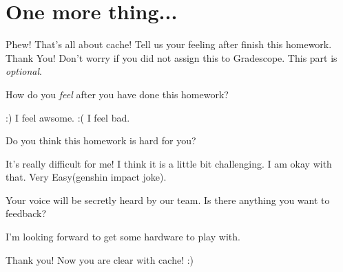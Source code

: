 \section*{One more thing...}
Phew! That's all about cache! Tell us your feeling after finish this
homework. Thank You! Don't worry if you did not assign this to
Gradescope. This part is \emph{optional}.

\begin{questions}

\question[0] How do you \emph{feel} after you have done this homework?

{
    \begin{solution}
        \begin{checkboxes}
            \CorrectChoice :) I feel awsome.
            \choice :( I feel bad.
        \end{checkboxes}
    \end{solution}
}

\question[0] Do you think this homework is hard for you?

{
    \begin{solution}
        \begin{checkboxes}
            \choice It's really difficult for me!
            \choice I think it is a little bit challenging.
            \choice I am okay with that.
            \CorrectChoice Very Easy(genshin impact joke).
        \end{checkboxes}
    \end{solution}
}

\question[0] Your voice will be secretly heard by our team.
Is there anything you want to feedback?

{
    \begin{solution}
        \vspace{.1in}
        I'm looking forward to get some hardware to play with.
        \vspace{.3in}
    \end{solution}
}

\vspace*{\fill}
\begin{center}
\Large Thank you! Now you are clear with cache! :)
\end{center}

\end{questions}